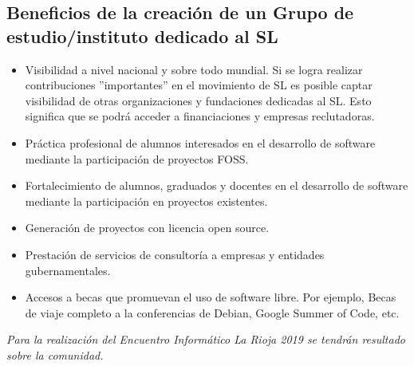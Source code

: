 \documentclass[12pt]{article}
\begin{document}
\subsection{Beneficios de la creación de un Grupo de estudio/instituto dedicado al SL}
\begin{itemize}
	\item Visibilidad a nivel nacional y sobre todo mundial. Si se logra realizar
	contribuciones ''importantes'' en el movimiento de SL es posible captar visibilidad
	de otras organizaciones y fundaciones dedicadas al SL. Esto significa
	que se podrá acceder a financiaciones y empresas reclutadoras.

	\item Práctica profesional de alumnos interesados en el desarrollo de software
	mediante la participación de proyectos FOSS.

	\item Fortalecimiento de alumnos, graduados y docentes en el desarrollo de 
	software mediante la participación en proyectos existentes.

	\item Generación de proyectos con licencia open source.

	\item Prestación de servicios de consultoría a empresas y entidades
	gubernamentales.

	\item Accesos a becas que promuevan el uso de software libre. Por ejemplo, Becas de
	viaje completo a la conferencias de Debian, Google Summer of Code, etc.
\end{itemize}

\textit{Para la realización del Encuentro Informático La Rioja 2019 se tendrán resultado
sobre la comunidad.}
\end{document}
